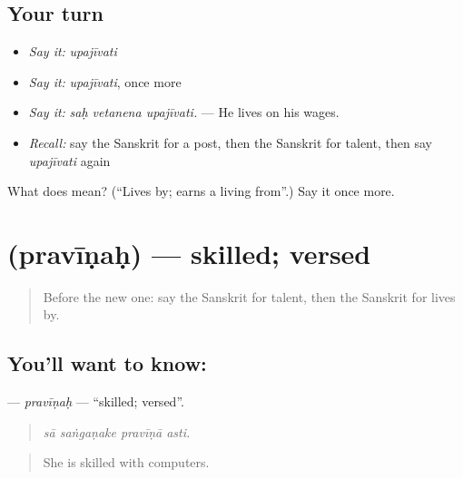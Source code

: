 \subsection*{Your turn}
\begin{itemize}
\raggedright
  \item \emph{Say it:} \emph{upajīvati}
  \item \emph{Say it:} \emph{upajīvati}, once more
  \item \emph{Say it:} \emph{saḥ vetanena upajīvati.} — He lives on his wages.
  \item \emph{Recall:} say the Sanskrit for a post, then the Sanskrit for talent, then say \emph{upajīvati} again
\end{itemize}

\begin{tcolorbox}[breakable,colback=teal!4,colframe=teal!35!black,title={Before you move on}]
What does  mean? (\textquotedblleft{}Lives by; earns a living from\textquotedblright{}.) Say it once more.
\end{tcolorbox}
\section[\texorpdfstring{\sk{प्रवीणः} (pravīṇaḥ)}{प्रवीणः (pravīṇaḥ)}]{ (pravīṇaḥ) — skilled; versed}

\label{lesson:SA-C504-pravinah}



\begin{quote}
Before the new one: say the Sanskrit for talent, then the Sanskrit for lives by.
\end{quote}

\subsection*{You'll want to know: }
\textbf{} — \emph{pravīṇaḥ} — \textquotedblleft{}skilled; versed\textquotedblright{}.

\begin{quote}
   
\end{quote}

\begin{quote}
\emph{sā saṅgaṇake pravīṇā asti.}
\end{quote}

\begin{quote}
She is skilled with computers.
\end{quote}

